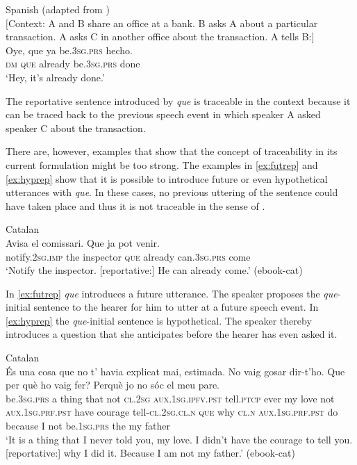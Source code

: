 \ea\label{ex:etxeparetrans}  Spanish (adapted from \citealt[613: ex 34]{Etxepare2010})\\  $[$Context: A and B share an office at a bank. B asks A about a particular transaction. A asks C in another office about the transaction. A tells B:$]$\\
\gll	Oye, que ya be.\textsc{3sg.prs} hecho. \\
\textsc{dm} \textsc{que} already be.\textsc{3sg.prs} done\\
\glt `Hey, it's already done.' 
\z

The reportative sentence introduced by \emph{que} is traceable in the context because it can be traced back to the previous speech event in which speaker A asked speaker C about the transaction.

  
There are, however, examples that show that the concept of traceability in its current formulation might be too strong. The  examples in \eqref{ex:futrep} and \eqref{ex:hyprep} show that it is possible to introduce future or  even  hypothetical  utterances with \emph{que}. In these cases, no previous uttering of the sentence could have taken place and thus it is not traceable in the sense of \citet{Etxepare2010}.


\ea\label{ex:futrep}
Catalan\\ 
\gll Avisa el comissari. Que ja pot venir. \\
notify.\textsc{2sg.imp} the inspector \textsc{que} already can.\textsc{3sg.prs} come\\
\glt `Notify the inspector. [reportative:]  He can already come.' (ebook-cat)
\z

In \eqref{ex:futrep} \emph{que} introduces a future utterance. The speaker proposes  the \emph{que}-initial  sentence  to the hearer for him to utter at a future speech event.  In \eqref{ex:hyprep} the \emph{que}-initial sentence is hypothetical.  The speaker thereby introduces a question that  she anticipates before the hearer has even asked it.  
 
\ea\label{ex:hyprep} 
Catalan\\ 
\gll És una cosa que no t’ havia explicat mai, estimada. No vaig gosar dir-t’ho. Que {per què} ho vaig fer? Perquè jo no sóc el meu pare. \\
be.\textsc{3sg.prs} a thing that not \textsc{cl.2sg} \textsc{aux.1sg.ipfv.pst} tell.\textsc{ptcp} ever {my love} not \textsc{aux.1sg.prf.pst} {have courage} tell-\textsc{cl.2sg}.\textsc{cl.n} \textsc{que} why \textsc{cl.n} \textsc{aux.1sg.prf.pst}  do because I not be.\textsc{1sg.prs} the my father\\
\glt `It is a thing that I never told you, my love. I didn't have the courage to tell you. [reportative:]  why I did it. Because I am not my father.' (ebook-cat)
\z







